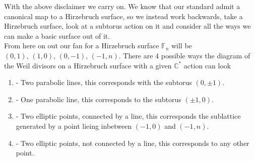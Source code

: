 \documentclass[11pt]{amsart}
\theoremstyle{definition}
\theoremstyle{definition}
\theoremstyle{definition}
\theoremstyle{definition}
\theoremstyle{definition}
\theoremstyle{definition}
\theoremstyle{definition}
\begin{document}
With the above disclaimer we carry on. We know that our standard admit a canonical map to a Hirzebruch surface, so we instead work backwards, take a Hirzebruch surface, look at a subtorus action on it and consider all the ways we can make a basic surface out of it.
\\
From here on out our fan for a Hirzebruch surface $\mathbb{F}_n$ will be $(0,1), \, (1,0), \, (0,-1), \, (-1, n)$. There are 4 possible ways the diagram of the Weil divisors on a Hirzebruch surface with a given $\mathbb{C}^*$ action can look
\begin{enumerate}[label =\Alph*]
\item - Two parabolic lines, this corresponds with the subtorus $(0, \pm 1)$.
\item - One parabolic line, this corresponds to the subtorus $(\pm 1, 0)$.
\item - Two elliptic points, connected by a line, this corresponds the sublattice generated by a point lieing inbetween $(-1,0)$ and $(-1, n)$.
\item - Two elliptic points, not connected by a line, this corresponds to any other point.
\end{enumerate} 

\begin{comment}
\begin{figure}[htbp]
\psset{unit=0.8cm}
\begin{pspicture}(0,-6)(18,0)
\psframe[linecolor=white](0.5,-6)(19,-1.5)

\psline[linecolor = blue]{-}(0.5, -4)(3.5, -4)
\psline{-}(1, -4.5)(1, -1.5)
\psline{-}(3, -4.5)(3, -1.5)
\psline[linecolor = blue]{-}(0.5, -2)(3.5, -2)

\psline{-}(5, -4)(8, -4)
\psline{-}(5.5, -4.5)(5.5, -1.5)
\psline[linecolor = blue]{-}(7.5, -4.5)(7.5, -1.5)
\psline{-}(5, -2)(8, -2)
\pscircle[fillcolor = red, fillstyle = solid](5.5, -2){0.15}


\psline{-}(9.5, -4)(12.5, -4)
\psline{-}(10, -4.5)(10, -1.5)
\psline{-}(12, -4.5)(12, -1.5)
\psline{-}(9.5, -2)(12.5, -2)
\pscircle[fillcolor = red, fillstyle = solid](10, -2){0.15}
\pscircle[fillcolor = red, fillstyle = solid](12, -2){0.15}

\psline{-}(14, -4)(17, -4)
\psline{-}(14.5, -4.5)(14.5, -1.5)
\psline{-}(16.5, -4.5)(16.5, -1.5)
\psline{-}(14, -2)(17, -2)
\pscircle[fillcolor = red, fillstyle = solid](14.5, -2){0.15}
\pscircle[fillcolor = red, fillstyle = solid](16.5, -4){0.15}

\end{pspicture}
\caption{The possible fibers in the theorem.}
\end{figure}
\end{comment}
\end{document}
